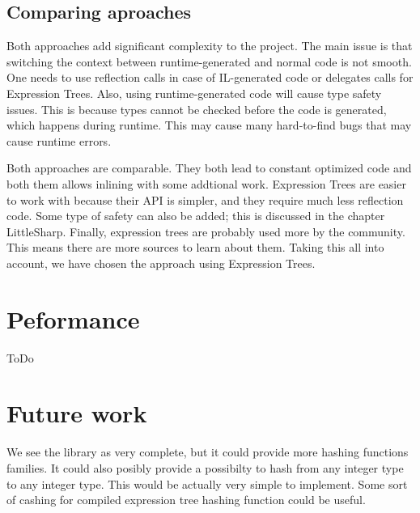 \subsection{Comparing aproaches}
Both approaches add significant complexity to the project. The main issue is that switching the context between runtime-generated and normal code is not smooth. One needs to use reflection calls in case of IL-generated code or delegates calls for Expression Trees. 
Also, using runtime-generated code will cause type safety issues. This is because types cannot be checked before the code is generated, which happens during runtime. This may cause many hard-to-find bugs that may cause runtime errors.

Both approaches are comparable. They both lead to constant optimized code and both them allows inlining with some addtional work. Expression Trees are easier to work with because their API is simpler, and they require much less reflection code. Some type of safety can also be added; this is discussed in the chapter LittleSharp. Finally, expression trees are probably used more by the community. This means there are more sources to learn about them.
Taking this all into account, we have chosen the approach using Expression Trees.

\section{Peformance}

ToDo 

\section{Future work}
We see the library as very complete, but it could provide more hashing functions families. It could also posibly  provide a possibilty to hash from any integer type to any integer type. This would be actually very simple to implement.
Some sort of cashing for compiled expression tree hashing function could be useful.

